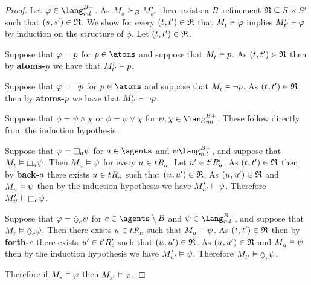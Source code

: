 \begin{proof}
Let $\phi \in \langMlPlusBs$.
As $\kPModel{\kStateS} \simulatesBs \kPModelP{\kStateSP}$ there exists a $B$-refinement $\refinement \subseteq \kStates \times \kStatesP$ such that $(\kStateS, \kStateSP) \in \refinement$.
We show for every $(\kStateT, \kStateTP) \in \refinement$ that $\kPModel{\kStateT} \entails \phi$ implies ${M^{\prime}_{{t}^{\prime}}} \vDash \varphi$ by induction on the structure of $\phi$.
Let $(\kStateT, \kStateTP) \in \refinement$.

Suppose that $\varphi = p$ for $\atomP \in \atoms$ and suppose that $\kPModel{\kStateT} \entails \atomP$.
As $(\kStateT, \kStateTP) \in \refinement$ then by {\bf atoms-$p$} we have that ${M^{\prime}_{{t}^{\prime}}} \vDash p$.

Suppose that $\varphi = \lnot p$ for $\atomP \in \atoms$ and suppose that $\kPModel{\kStateT} \entails \lnot \atomP$.
As $(\kStateT, \kStateTP) \in \refinement$ then by {\bf atoms-$p$} we have that ${M^{\prime}_{{t}^{\prime}}} \vDash \lnot p$.

Suppose that $\phi = \psi \land \chi$ or $\phi = \psi \lor \chi$ for $\psi, \chi \in \langMlPlusBs$.
These follow directly from the induction hypothesis.

Suppose that $\phi = \necessaryA \psi$ for $\agentA \in \agents$ and $\psi \langMlPlusBs$, and suppose that $\kPModel{\kStateT} \entails \necessaryA \psi$.
Then $\kPModel{\kStateU} \entails \psi$ for every $\kStateU \in \kSuccessorsA{\kStateT}$.
Let ${u}^{\prime} \in {{t}^{\prime}} {R^{\prime}_{a}}$.
As $(\kStateT, \kStateTP) \in \refinement$ then by {\bf back-$a$} there exists $\kStateU \in \kSuccessorsA{\kStateT}$ such that $(\kStateU, \kStateUP) \in \refinement$.
As $(\kStateU, \kStateUP) \in \refinement$ and $\kPModel{\kStateU} \entails \psi$ then by the induction hypothesis we have ${M^{\prime}_{{u}^{\prime}}} \vDash \psi$.
Therefore $\kPModelP{\kStateTP} \entails \necessaryA \psi$.

Suppose that $\phi = \possibleC \psi$ for $\agentC \in \agents \setminus \agentsB$ and $\psi \in \langMlPlusBs$, and suppose that $\kPModel{\kStateT} \entails \possibleC \psi$.
Then there exists $\kStateU \in \kSuccessorsC{\kStateT}$ such that $\kPModel{\kStateU} \entails \psi$.
As $(\kStateT, \kStateTP) \in \refinement$ then by {\bf forth-$c$} there exists ${u}^{\prime} \in {{t}^{\prime}} {R^{\prime}_{c}}$ such that $(\kStateU, \kStateUP) \in \refinement$.
As $(\kStateU, \kStateUP) \in \refinement$ and $\kPModel{\kStateU} \entails \psi$ then by the induction hypothesis we have ${M^{\prime}_{{u}^{\prime}}} \vDash \psi$.
Therefore $\kPModel{\kStateTP} \entails \possibleC \psi$.

Therefore if $\kPModel{\kStateS} \entails \phi$ then $\kPModel{\kStateSP} \entails \phi$.
\end{proof}

